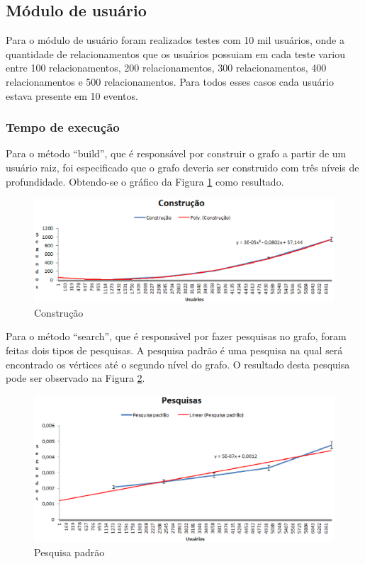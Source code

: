\subsection{Módulo de usuário}

Para o módulo de usuário foram realizados testes com 10 mil usuários, onde a quantidade de relacionamentos que os usuários possuiam em cada teste variou entre 100 relacionamentos, 200 relacionamentos, 300 relacionamentos, 400 relacionamentos e 500 relacionamentos. Para todos esses casos cada usuário estava presente em 10 eventos.

\subsubsection{Tempo de execução}

Para o método ``build'', que é responsável por construir o grafo a partir de um usuário raiz, foi especificado que o grafo deveria ser construido com três níveis de profundidade. Obtendo-se o gráfico da Figura \ref{build_tempo} como resultado.

\begin{figure}[!h]
	\centering
	\includegraphics[scale=0.8]{figuras/resultados/graficos/construcao_tempo.eps}
	\caption[Construção]{Construção}
	\label{build_tempo}
\end{figure}

Para o método ``search'', que é responsável por fazer pesquisas no grafo, foram feitas dois tipos de pesquisas. A pesquisa padrão é uma pesquisa na qual será encontrado os vértices até o segundo nível do grafo. O resultado desta pesquisa pode ser observado na Figura \ref{pesquisa_padrao}.

\newpage

\begin{figure}[!h]
	\centering
	\includegraphics[scale=0.8]{figuras/resultados/graficos/pesquisa_padrao.eps}
	\caption[Pesquisas]{Pesquisa padrão}
	\label{pesquisa_padrao}
\end{figure}

